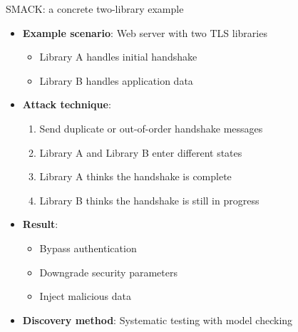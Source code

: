 \ifdefined\PRESENTATION\else\PassOptionsToClass{handout}{beamer}\fi\documentclass[aspectratio=169, lualatex]{beamer}
\begin{document}
\begin{frame}{SMACK: a concrete two-library example}
	\begin{itemize}[<+->]
		\item \textbf{Example scenario}: Web server with two TLS libraries
		      \begin{itemize}
			      \item Library A handles initial handshake
			      \item Library B handles application data
		      \end{itemize}
		\item \textbf{Attack technique}:
		      \begin{enumerate}
			      \item Send duplicate or out-of-order handshake messages
			      \item Library A and Library B enter different states
			      \item Library A thinks the handshake is complete
			      \item Library B thinks the handshake is still in progress
		      \end{enumerate}
		\item \textbf{Result}:
		      \begin{itemize}
			      \item Bypass authentication
			      \item Downgrade security parameters
			      \item Inject malicious data
		      \end{itemize}
		\item \textbf{Discovery method}: Systematic testing with model checking
	\end{itemize}
\end{frame}
\end{document}

